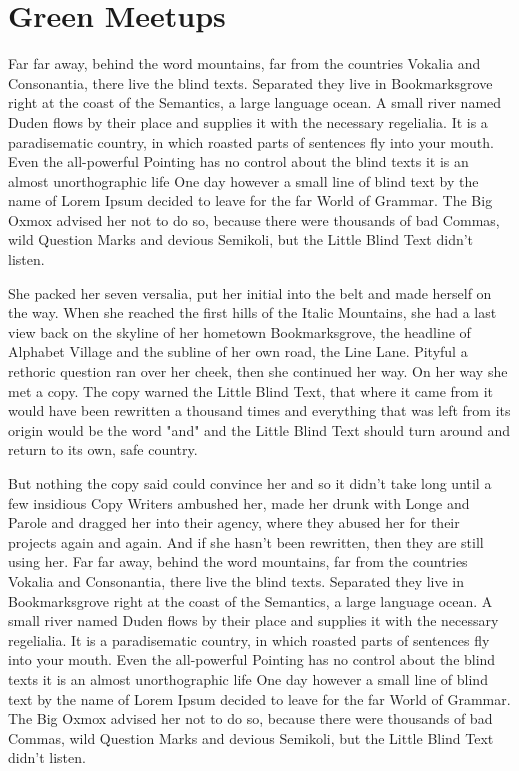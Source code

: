 
\chapter{Green Meetups}\label{chap:meetup}

Far far away, behind the word mountains, far from the countries Vokalia and Consonantia, there live the blind texts. Separated they live in Bookmarksgrove right at the coast of the Semantics, a large language ocean. A small river named Duden flows by their place and supplies it with the necessary regelialia. It is a paradisematic country, in which roasted parts of sentences fly into your mouth. Even the all-powerful Pointing has no control about the blind texts it is an almost unorthographic life One day however a small line of blind text by the name of Lorem Ipsum decided to leave for the far World of Grammar. The Big Oxmox advised her not to do so, because there were thousands of bad Commas, wild Question Marks and devious Semikoli, but the Little Blind Text didn’t listen.

She packed her seven versalia, put her initial into the belt and made herself on the way. When she reached the first hills of the Italic Mountains, she had a last view back on the skyline of her hometown Bookmarksgrove, the headline of Alphabet Village and the subline of her own road, the Line Lane. Pityful a rethoric question ran over her cheek, then she continued her way. On her way she met a copy. The copy warned the Little Blind Text, that where it came from it would have been rewritten a thousand times and everything that was left from its origin would be the word "and" and the Little Blind Text should turn around and return to its own, safe country.

But nothing the copy said could convince her and so it didn’t take long until a few insidious Copy Writers ambushed her, made her drunk with Longe and Parole and dragged her into their agency, where they abused her for their projects again and again. And if she hasn’t been rewritten, then they are still using her. Far far away, behind the word mountains, far from the countries Vokalia and Consonantia, there live the blind texts. Separated they live in Bookmarksgrove right at the coast of the Semantics, a large language ocean. A small river named Duden flows by their place and supplies it with the necessary regelialia. It is a paradisematic country, in which roasted parts of sentences fly into your mouth. Even the all-powerful Pointing has no control about the blind texts it is an almost unorthographic life One day however a small line of blind text by the name of Lorem Ipsum decided to leave for the far World of Grammar. The Big Oxmox advised her not to do so, because there were thousands of bad Commas, wild Question Marks and devious Semikoli, but the Little Blind Text didn’t listen.